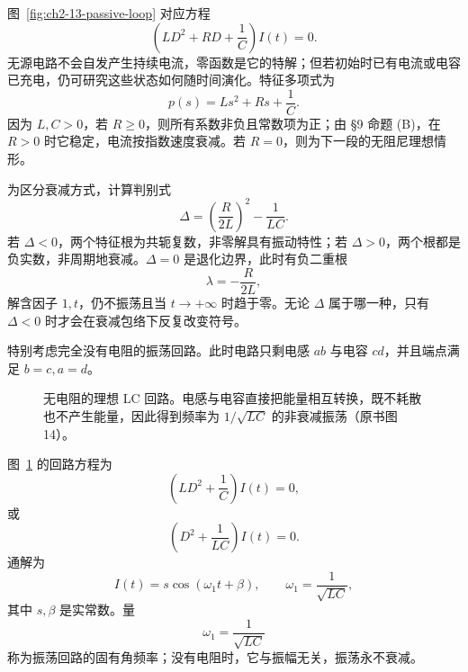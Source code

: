 图~\ref{fig:ch2-13-passive-loop} 对应方程
\begin{equation}
 \left(LD^2+RD+\frac1C\right)I(t)=0.
 \label{eq:ch2-13-passive-loop-equation}
\end{equation}
无源电路不会自发产生持续电流，零函数是它的特解；但若初始时已有电流或电容已充电，仍可研究这些状态如何随时间演化。特征多项式为
\begin{equation}
 p(s)=Ls^2+Rs+\frac1C.
 \label{eq:ch2-13-loop-characteristic}
\end{equation}
因为 \(L,C>0\)，若 \(R\ge0\)，则所有系数非负且常数项为正；由 §9 命题 (B)，在 \(R>0\) 时它稳定，电流按指数速度衰减。若 \(R=0\)，则为下一段的无阻尼理想情形。

为区分衰减方式，计算判别式
\begin{equation}
 \Delta=\left(\frac{R}{2L}\right)^2-\frac1{LC}.
 \label{eq:ch2-13-loop-discriminant}
\end{equation}
若 \(\Delta<0\)，两个特征根为共轭复数，非零解具有振动特性；若 \(\Delta>0\)，两个根都是负实数，非周期地衰减。\(\Delta=0\) 是退化边界，此时有负二重根
\[
 \lambda=-\frac{R}{2L},
\]
解含因子 \(1,t\)，仍不振荡且当 \(t\to+\infty\) 时趋于零。无论 \(\Delta\) 属于哪一种，只有 \(\Delta<0\) 时才会在衰减包络下反复改变符号。

特别考虑完全没有电阻的振荡回路。此时电路只剩电感 \(ab\) 与电容 \(cd\)，并且端点满足 \(b=c,a=d\)。

\begin{figure}[H]
 \centering
 \resizebox{0.34\textwidth}{!}{}
 \caption{无电阻的理想 LC 回路。电感与电容直接把能量相互转换，既不耗散也不产生能量，因此得到频率为 \(1/\sqrt{LC}\) 的非衰减振荡（原书图 14）。}
 \label{fig:ch2-13-lc-loop}
\end{figure}

图~\ref{fig:ch2-13-lc-loop} 的回路方程为
\begin{equation}
 \left(LD^2+\frac1C\right)I(t)=0,
 \label{eq:ch2-13-lc-equation}
\end{equation}
或
\begin{equation}
 \left(D^2+\frac1{LC}\right)I(t)=0.
 \label{eq:ch2-13-lc-normalized}
\end{equation}
通解为
\begin{equation}
 I(t)=s\cos(\omega_1t+\beta),
 \qquad
 \omega_1=\frac1{\sqrt{LC}},
 \label{eq:ch2-13-lc-solution}
\end{equation}
其中 \(s,\beta\) 是实常数。量
\[
 \omega_1=\frac1{\sqrt{LC}}
\]
称为振荡回路的固有角频率；没有电阻时，它与振幅无关，振荡永不衰减。

